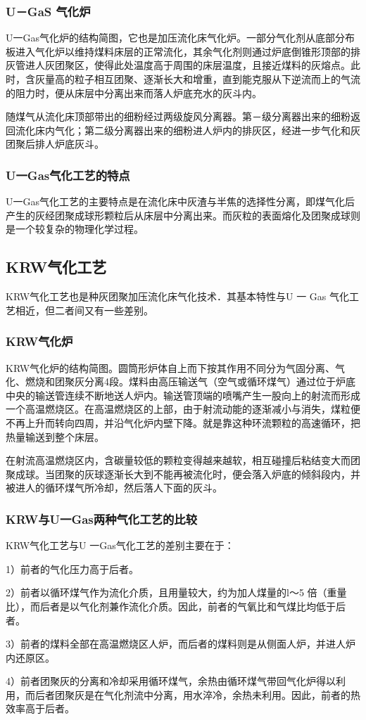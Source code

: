 \documentclass[10pt,openany]{ctexbook}
\begin{document}
\subsubsection{U－GaS 气化炉}
U一Gas气化炉的结构简图，它也是加压流化床气化炉。一部分气化剂从底部分布板进入气化炉以维持煤料床层的正常流化，其余气化剂则通过炉底倒锥形顶部的排灰管进人灰团聚区，使得此处温度高于周围的床层温度，且接近煤料的灰熔点。此时，含灰量高的粒子相互团聚、逐渐长大和增重，直到能克服从下逆流而上的气流的阻力时，便从床层中分离出来而落人炉底充水的灰斗内。\par
  随煤气从流化床顶部带出的细粉经过两级旋风分离器。第－级分离器出来的细粉返回流化床内气化；第二级分离器出来的细粉进人炉内的排灰区，经进一步气化和灰团聚后排人炉底灰斗。
 \subsubsection{U一Gas气化工艺的特点}
U一Gas气化工艺的主要特点是在流化床中灰渣与半焦的选择性分离，即煤气化后产生的灰经团聚成球形颗粒后从床层中分离出来。而灰粒的表面熔化及团聚成球则是一个较复杂的物理化学过程。
\subsection{KRW气化工艺 }
KRW气化工艺也是种灰团聚加压流化床气化技术．其基本特性与U 一 Gas 气化工艺相近，但二者间又有一些差别。
 \subsubsection{KRW气化炉}
KRW气化炉的结构简图。圆筒形炉体自上而下按其作用不同分为气固分离、气化、燃烧和团聚灰分离4段。煤料由高压输送气（空气或循环煤气）通过位于炉底中央的输送管连续不断地送人炉内。输送管顶端的喷嘴产生一股向上的射流而形成一个高温燃烧区。在高温燃烧区的上部，由于射流动能的逐渐减小与消失，煤粒便不再上升而转向四周，并沿气化炉内壁下降。就是靠这种环流颗粒的高速循环，把热量输送到整个床层。\par
在射流高温燃烧区内，含碳量较低的颗粒变得越来越软，相互碰撞后粘结变大而团聚成球。当团聚的灰球逐渐长大到不能再被流化时，便会落入炉底的倾斜段内，并被进人的循环煤气所冷却，然后落人下面的灰斗。
 \subsubsection{KRW与U一Gas两种气化工艺的比较}
KRW气化工艺与U 一Gas气化工艺的差别主要在于：\par
1）前者的气化压力高于后者。\par
2）前者以循环煤气作为流化介质，且用量较大，约为加人煤量的l～5 倍（重量比），而后者是以气化剂兼作流化介质。因此，前者的气氧比和气煤比均低于后者。\par
3）前者的煤料全部在高温燃烧区人炉，而后者的煤料则是从侧面人炉，并进人炉内还原区。 \par
4）前者团聚灰的分离和冷却采用循环煤气，余热由循环煤气带回气化炉得以利用，而后者团聚灰是在气化剂流中分离，用水淬冷，余热未利用。因此，前者的热效率高于后者。
\end{document}
